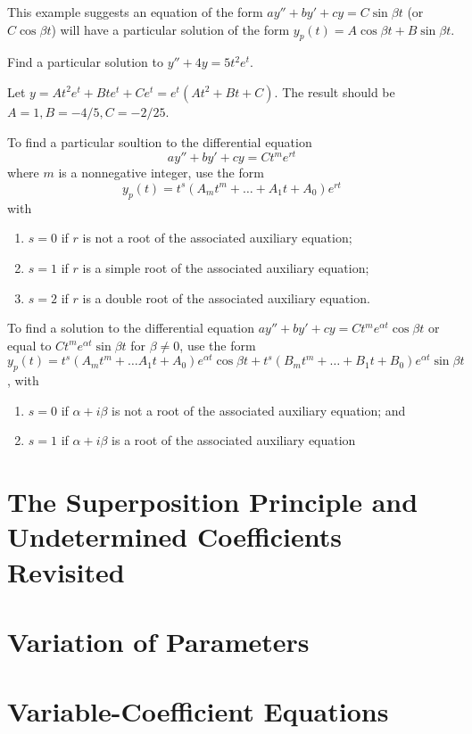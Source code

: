 \documentclass[../diffeq.tex]{subfiles}
\begin{document}
This example suggests an equation of the form $ay''+by'+cy=C\sin\beta t$ (or $C\cos\beta t$) will have a particular solution of the form $y_p(t)=A\cos\beta t+B\sin\beta t$.

\begin{example}
    Find a particular solution to $y''+4y=5t^2e^t$.

    Let $y= At^2e^t+Bte^t+Ce^t = e^t(At^2+Bt+C)$. The result should be $A=1,B=-4/5, C=-2/25$.
\end{example}

To find a particular soultion to the differential equation 
\[ ay''+by'+cy=Ct^me^{rt} \]
where $m$ is a nonnegative integer, use the form 
\[ y_p(t)=t^s(A_mt^m+\dots +A_1t+A_0)e^{rt} \]
with 
\begin{enumerate}
    \item $s=0$ if $r$ is not a root of the associated auxiliary equation;
    \item $s=1$ if $r$ is a simple root of the associated auxiliary equation;
    \item $s=2$ if $r$ is a double root of the associated auxiliary equation.
\end{enumerate}

To find a solution to the differential equation $ay''+by'+cy = Ct^me^{\alpha t}\cos \beta t$ or equal to $Ct^me^{\alpha t}\sin\beta t$ for $\beta \neq 0$, use the form $y_p(t)=t^s(A_mt^m+\dots A_1t+A_0)e^{\alpha t}\cos\beta t+t^s(B_mt^m+\dots +B_1t+B_0)e^{\alpha t}\sin\beta t$, with 
\begin{enumerate}
    \item $s=0$ if $\alpha + i\beta$ is not a root of the associated auxiliary equation; and 
    \item $s=1$ if $\alpha + i\beta$ is a root of the associated auxiliary equation
\end{enumerate}

\section{The Superposition Principle and Undetermined Coefficients Revisited}
\section{Variation of Parameters}
\section{Variable-Coefficient Equations}
\end{document}
